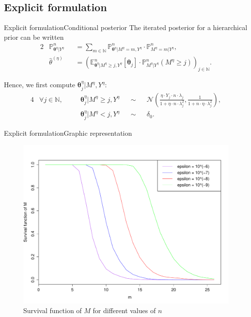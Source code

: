 \documentclass[10pt]{beamer}
\begin{document}
\subsection{Explicit formulation}
\begin{frame}{Explicit formulation}{Conditional posterior}
The iterated posterior for a hierarchical prior can be written
\textcolor{red!90!black}{
\begin{alignat*}{2}
&\mathbb{P}_{\boldsymbol{\theta}^{\eta}\vert Y^{\eta}}^{n} &&= \sum\limits_{m \in \mathbb{N}} \mathbb{P}_{\boldsymbol{\theta}^{\eta} \vert M^{\eta} = m, Y^{\eta}}^{n} \cdot \mathbb{P}^{n}_{M^{\eta} = m \vert Y^{\eta}},\\
&\widehat{\theta}^{\left(\eta\right)} &&= \left(\mathbb{E}_{\boldsymbol{\theta}^{\eta}\vert M^{\eta} \geq j, Y^{\eta}}^{n}\left[\boldsymbol{\theta}_{j}\right] \cdot \mathbb{P}_{M^{\eta} \vert Y^{\eta}}^{n}\left(M^{\eta} \geq j\right)\right)_{j \in \mathbb{N}}.
\end{alignat*}}

Hence, we first compute $\boldsymbol{\theta}^{\eta}_{j} \vert M^{\eta}, Y^{\eta}$:
\textcolor{red!90!black}{\begin{alignat*}{4}
& \forall j \in \mathbb{N}, && \quad \boldsymbol{\theta}^{\eta}_{j} \vert M^{\eta} \geq j, Y^{\eta} &&\sim &&\mathcal{N}\left(\frac{\eta \cdot Y_{j} \cdot n \cdot \lambda_{j}}{1 + \eta \cdot n \cdot \lambda_{j}^{2}}, \frac{1}{1 + n \cdot \eta \cdot \lambda_{j}^{2}} \right),\\
&  && \quad \boldsymbol{\theta}^{\eta}_{j} \vert M^{\eta} < j, Y^{\eta} &&\sim &&\delta_{0}.
\end{alignat*}}
\end{frame}

\begin{frame}{Explicit formulation}{Graphic representation}
\begin{figure}
\centering
 \includegraphics[width=.8\linewidth]{M.pdf}
\caption{Survival function of $M$ for different values of $n$}\label{M}
\end{figure}
\end{frame}
\end{document}
